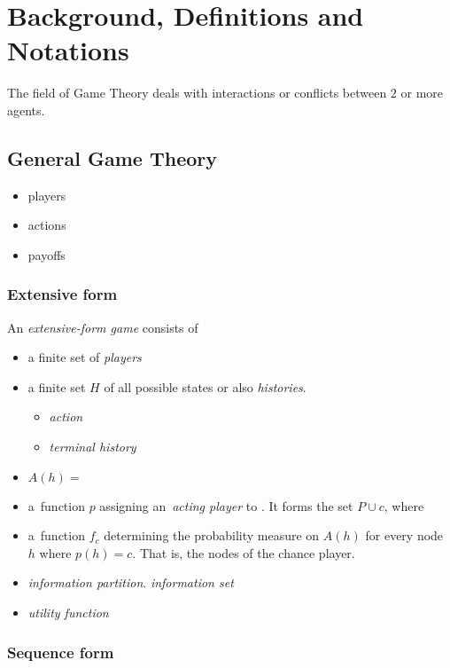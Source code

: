 \chapter{Background, Definitions and Notations}

The field of Game Theory deals with interactions or conflicts between $2$ or more agents.
\todo

\section{General Game Theory}

\begin{itemize}
  \item players
  \item actions
  \item payoffs
\end{itemize}

\subsection{Extensive form}

An \emph{extensive-form game} consists of

\begin{itemize}
  \item a finite set of \emph{players}
  \item a finite set $H$ of all possible states or also \emph{histories}.
    \begin{itemize}
      \item \emph{action}
      \item \emph{terminal history}
    \end{itemize}
  \item $A(h) = $
  \item a~function $p$ assigning an~\emph{acting player} to \todo.
    It forms the set $P \cup c$, where \todo
  \item a~function $f_c$ determining the probability measure on $A(h)$ for every node $h$ where $p(h) = c$.
    That is, the nodes of the chance player.
  \item \emph{information partition}. \emph{information set}
  \item \emph{utility function}
\end{itemize}

\subsection{Sequence form}

